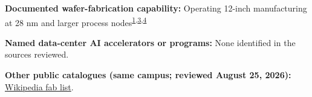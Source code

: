 \begin{minipage}[t][0.90\textheight][t]{\textwidth}
\begin{minipage}[t]{\textwidth}
\begin{minipage}[t]{0.32\textwidth}
\medskip
{\footnotesize\textbf{Documented wafer-fabrication capability:} Operating 12-inch manufacturing at 28 nm and larger process nodes\nobreak\textsuperscript{\href{\detokenize{https://www.smics.com/uploads/6795f77a/}\%\detokenize{26e8}\%\detokenize{2687}\%\detokenize{26aa}\%\detokenize{26e8}\%\detokenize{26a1}\%\detokenize{268c}\%\detokenize{26e7}\%\detokenize{269b}\%\detokenize{2691}\%\detokenize{26e6}\%\detokenize{26b5}\%\detokenize{268b}\%\detokenize{26e5}\%\detokenize{26b9}\%\detokenize{26b4}\%\detokenize{26e5}\%\detokenize{26ba}\%\detokenize{26a6}\%\detokenize{26e6}\%\detokenize{268a}\%\detokenize{26a5}\%\detokenize{26e5}\%\detokenize{2691}\%\detokenize{268a2024}\%\detokenize{26e5}\%\detokenize{26b9}\%\detokenize{26b4.pdf}}{\textcolor{accent}{1}},\href{\detokenize{https://www1.hkexnews.hk/listedco/listconews/sehk/2020/1204/2020120401701.pdf}}{\textcolor{accent}{3}},\href{\detokenize{https://www.smics.com/uploads/2025}\%\detokenize{26e5}\%\detokenize{26b9}\%\detokenize{26b4}\%\detokenize{26e8}\%\detokenize{2687}\%\detokenize{26aa}\%\detokenize{26e8}\%\detokenize{26a1}\%\detokenize{268c}\%\detokenize{26e7}\%\detokenize{269b}\%\detokenize{2691}\%\detokenize{26e6}\%\detokenize{26b5}\%\detokenize{268b}\%\detokenize{26e6}\%\detokenize{2696}\%\detokenize{26b9}\%\detokenize{26e6}\%\detokenize{26a1}\%\detokenize{2688.pdf}}{\textcolor{accent}{4}}}\par}
\end{minipage}
\end{minipage}
\par\vspace{0.65em}
\medskip
{\footnotesize\textbf{Named data-center AI accelerators or programs:} None identified in the sources reviewed.\par}
\smallskip
{\sffamily\scriptsize\color{black!62}\textbf{Other public catalogues (same campus; reviewed August 25, 2026):} \href{\detokenize{https://en.wikipedia.org/w/index.php?title=List_of_semiconductor_fabrication_plants&oldid=1370451124}\#\detokenize{Open_plants}}{Wikipedia fab list}.\par}
\medskip

\end{minipage}
